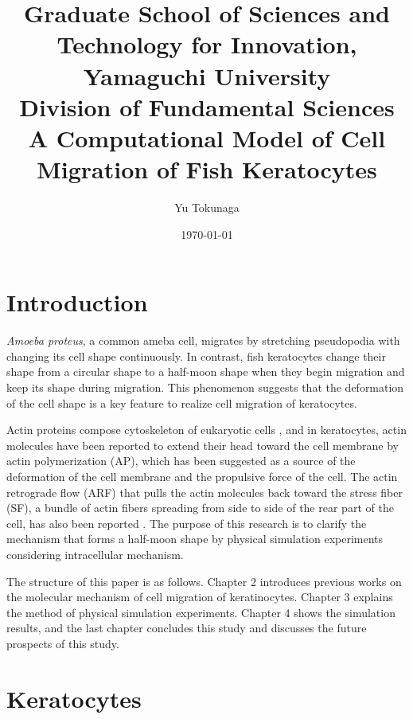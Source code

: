 \documentclass[a4paper,12pt, oneside]{book}
\title{\Large Graduate School of Sciences and Technology for Innovation, Yamaguchi University\\[1cm]
Division of Fundamental Sciences\\[3cm]
\huge A Computational Model of Cell Migration of Fish Keratocytes\\[5cm]
}
\author{Yu Tokunaga}
\date{\Large \today}
\begin{document}
\maketitle
\setcounter{page}{1}
\tableofcontents
\chapter{Introduction}
\setcounter{page}{1}
{\it Amoeba proteus},  a common ameba cell, migrates by stretching pseudopodia with changing its cell shape continuously.
In contrast, fish keratocytes change their shape from a circular shape to a half-moon shape when they begin migration and keep its shape during migration.
This phenomenon suggests that the deformation of the cell shape is a key feature to realize cell migration of keratocytes.

Actin proteins compose cytoskeleton of eukaryotic cells \cite{svitkina1997analysis}, and in keratocytes, actin molecules have been reported to extend their head toward the cell membrane by actin polymerization (AP), which has been suggested as a source of the deformation of the cell membrane and the propulsive force of the cell.
The actin retrograde flow (ARF) that pulls the actin molecules back toward the stress fiber (SF), a bundle of actin fibers spreading from side to side of the rear part of the cell, has also been reported \cite{nakashima2015molecular}.
The purpose of this research is to clarify the mechanism that forms a half-moon shape by physical simulation experiments considering intracellular mechanism.

The structure of this paper is as follows.
Chapter 2 introduces previous works on the molecular mechanism of cell migration of keratinocytes.
Chapter 3 explains the  method of physical simulation experiments.
Chapter 4 shows the simulation results, and the last chapter concludes this study and discusses the future prospects of this study.

\chapter{Keratocytes}
\end{document}
